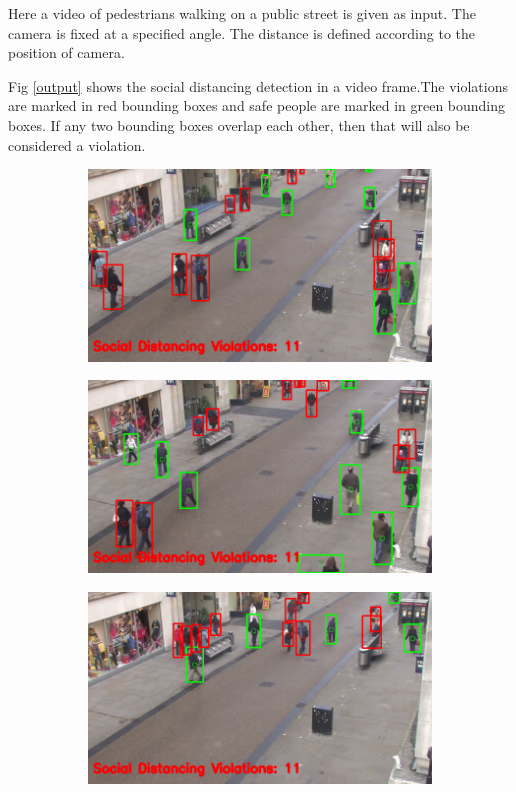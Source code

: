 \documentclass{svproc}
\begin{document}
Here a video of pedestrians walking on a public street is given as input. The camera is fixed at a specified angle. The distance is defined according to the position of camera. 
\par
Fig \ref{output} shows the social distancing detection in a video frame.The violations are marked in red bounding boxes and safe people are marked in green bounding boxes. If any two bounding boxes overlap each other, then that will also be considered a violation. 

\begin{figure}[!h]
	\centering
	\begin{subfigure}[b]{0.8\columnwidth}
		\includegraphics[width=\linewidth]{./images/v1.png}
		\caption{}
	\end{subfigure}
	\begin{subfigure}[b]{0.8\columnwidth}
		\includegraphics[width=\linewidth]{./images/v2.png}
		\caption{}
	\end{subfigure}
	\begin{subfigure}[b]{0.8\columnwidth}
		\includegraphics[width=\linewidth]{./images/v4.png}

\end{subfigure}
\end{figure}
\end{document}
